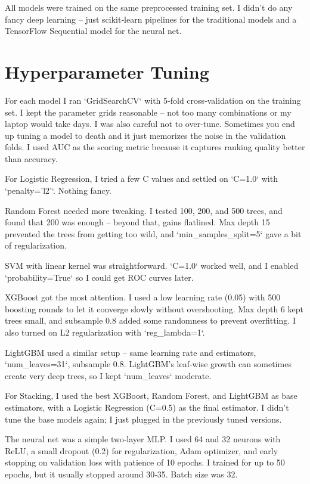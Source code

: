 \documentclass[11pt, a4paper, oneside]{book}
\begin{document}
All models were trained on the same preprocessed training set. I didn't do any fancy deep learning – just scikit‑learn pipelines for the traditional models and a TensorFlow Sequential model for the neural net.

\section{Hyperparameter Tuning}
For each model I ran `GridSearchCV` with 5‑fold cross‑validation on the training set. I kept the parameter grids reasonable – not too many combinations or my laptop would take days. I was also careful not to over‑tune. Sometimes you end up tuning a model to death and it just memorizes the noise in the validation folds. I used AUC as the scoring metric because it captures ranking quality better than accuracy.

For Logistic Regression, I tried a few C values and settled on `C=1.0` with `penalty='l2'`. Nothing fancy.

Random Forest needed more tweaking. I tested 100, 200, and 500 trees, and found that 200 was enough – beyond that, gains flatlined. Max depth 15 prevented the trees from getting too wild, and `min_samples_split=5` gave a bit of regularization.

SVM with linear kernel was straightforward. `C=1.0` worked well, and I enabled `probability=True` so I could get ROC curves later.

XGBoost got the most attention. I used a low learning rate (0.05) with 500 boosting rounds to let it converge slowly without overshooting. Max depth 6 kept trees small, and subsample 0.8 added some randomness to prevent overfitting. I also turned on L2 regularization with `reg_lambda=1`.

LightGBM used a similar setup – same learning rate and estimators, `num_leaves=31`, subsample 0.8. LightGBM’s leaf‑wise growth can sometimes create very deep trees, so I kept `num_leaves` moderate.

For Stacking, I used the best XGBoost, Random Forest, and LightGBM as base estimators, with a Logistic Regression (C=0.5) as the final estimator. I didn't tune the base models again; I just plugged in the previously tuned versions.

The neural net was a simple two‑layer MLP. I used 64 and 32 neurons with ReLU, a small dropout (0.2) for regularization, Adam optimizer, and early stopping on validation loss with patience of 10 epochs. I trained for up to 50 epochs, but it usually stopped around 30‑35. Batch size was 32.
\end{document}
